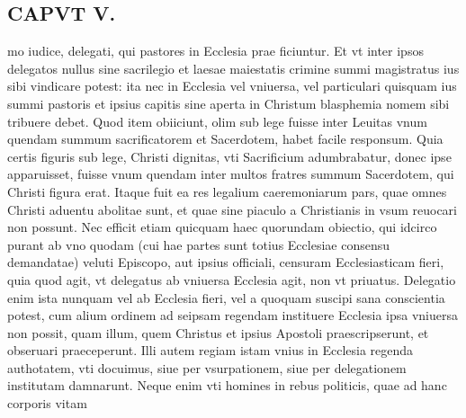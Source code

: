 \documentclass{article}
\begin{document}
\begin{pages}
\section*{CAPVT  V. }
\marginpar{[ p.243 ]}\pstart mo iudice, delegati, qui pastores in Ecclesia prae ficiuntur. Et vt inter ipsos delegatos nullus sine sacrilegio et laesae maiestatis crimine summi magistratus ius sibi vindicare potest: ita nec in Ecclesia vel vniuersa, vel particulari quisquam ius summi pastoris et ipsius capitis sine aperta in Christum blasphemia nomem sibi tribuere debet. Quod item obiiciunt, olim sub lege fuisse inter Leuitas vnum quendam summum sacrificatorem et Sacerdotem, habet facile responsum. Quia certis figuris sub lege, Christi dignitas, vti Sacrificium adumbrabatur, donec ipse apparuisset, fuisse vnum quendam inter multos fratres summum Sacerdotem, qui Christi figura erat. Itaque fuit ea res legalium caeremoniarum pars, quae omnes Christi aduentu abolitae sunt, et quae sine piaculo a Christianis in vsum reuocari non possunt. Nec efficit etiam quicquam haec quorundam obiectio, qui idcirco purant ab vno quodam (cui hae partes sunt totius Ecclesiae consensu demandatae) veluti Episcopo, aut ipsius officiali, censuram Ecclesiasticam fieri, quia quod agit, vt delegatus ab vniuersa Ecclesia agit, non vt priuatus. Delegatio enim ista nunquam vel ab Ecclesia fieri, vel a quoquam suscipi sana conscientia potest, cum alium ordinem ad seipsam regendam instituere Ecclesia ipsa vniuersa non possit, quam illum, quem Christus et ipsius Apostoli praescripserunt, et obseruari praeceperunt. Illi autem regiam istam vnius in Ecclesia regenda authotatem, vti docuimus, siue per vsurpationem, siue per delegationem institutam damnarunt. Neque enim vti homines in rebus politicis, quae ad hanc corporis vitam  \pend

\end{pages}
\end{document}
